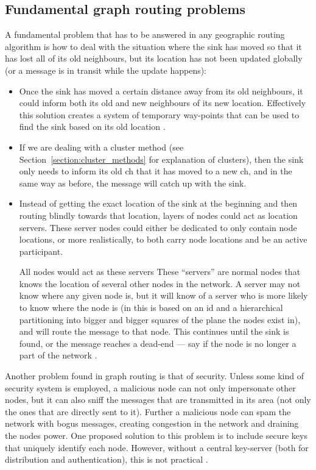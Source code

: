 \subsection{Fundamental graph routing problems}
A fundamental problem that has to be answered in any geographic routing algorithm is how to deal with the situation where the sink has moved so that it has lost all of its old neighbours, but its location has not been updated globally (or a message is in transit while the update happens):

\begin{itemize}
\item Once the sink has moved a certain distance away from its old neighbours, it could inform both its old and new neighbours of its new location. Effectively this solution creates a system of temporary way-points that can be used to find the sink based on its old location \cite{adaptive}.
\item If we are dealing with a cluster method (see Section~\ref{section:cluster_methods} for explanation of clusters), then the sink only needs to inform its old \ac{ch} that it has moved to a new \ac{ch}, and in the same way as before, the message will catch up with the sink.
\item Instead of getting the exact location of the sink at the beginning and then routing blindly towards that location, layers of nodes could act as location servers. These server nodes could either be dedicated to only contain node locations, or more realistically, to both carry node locations and be an active participant. 

All nodes would act as these servers These ``servers'' are normal nodes that knows the location of several other nodes in the network. A server may not know where any given node is, but it will know of a server who is more likely to know where the node is (in \cite{scaleLocation} this is based on an id and a hierarchical partitioning into bigger and bigger squares of the plane the nodes exist in), and will route the message to that node. This continues until the sink is found, or the message reaches a dead-end --- say if the node is no longer a part of the network \cite{scaleLocation}.
\end{itemize}

Another problem found in graph routing is that of security. Unless some kind of security system is employed, a malicious node can not only impersonate other nodes, but it can also sniff the messages that are transmitted in its area (not only the ones that are directly sent to it). Further a malicious node can spam the network with bogus messages, creating congestion in the network and draining the nodes power. One proposed solution to this problem is to include secure keys that uniquely identify each node. However, without a central key-server (both for distribution and authentication), this is not practical \cite{trustedRouting}.

